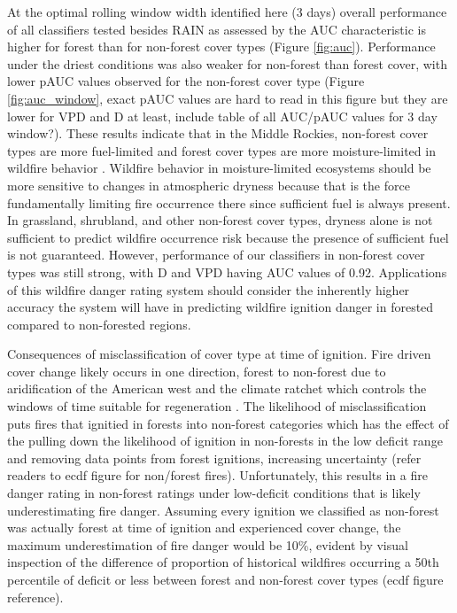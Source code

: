 \documentclass[11p]{article}
\begin{document}
At the optimal rolling window width identified here (3 days) overall performance of all classifiers tested besides RAIN as assessed by the AUC characteristic is higher for forest than for non-forest cover types (Figure \ref{fig:auc}). Performance under the driest conditions was also weaker for non-forest than forest cover, with lower pAUC values observed for the non-forest cover type (Figure \ref{fig:auc_window}, exact pAUC values are hard to read in this figure but they are lower for VPD and D at least, include table of all AUC/pAUC values for 3 day window?).  These results indicate that in the Middle Rockies, non-forest cover types are more fuel-limited and forest cover types are more moisture-limited in wildfire behavior \citep{meynEnvironmentalDriversLarge2007}. Wildfire behavior in moisture-limited ecosystems should be more sensitive to changes in atmospheric dryness because that is the force fundamentally limiting fire occurrence there since sufficient fuel is always present.  In grassland, shrubland, and other non-forest cover types, dryness alone is not sufficient to predict wildfire occurrence risk because the presence of sufficient fuel is not guaranteed.  However, performance of our classifiers in non-forest cover types was still strong, with D and VPD having AUC values of 0.92. Applications of this wildfire danger rating system should consider the inherently higher accuracy the system will have in predicting wildfire ignition danger in forested compared to non-forested regions.  

Consequences of misclassification of cover type at time of ignition. Fire driven cover change likely occurs in one direction, forest to non-forest due to aridification of the American west and the climate ratchet which controls the windows of time suitable for regeneration \citep{jacksonEcologyRatchetEvents2009}. The likelihood of misclassification puts fires that ignitied in forests into non-forest categories which has the effect of the pulling down the likelihood of ignition in non-forests in the low deficit range and removing data points from forest ignitions, increasing uncertainty (refer readers to ecdf figure for non/forest fires). Unfortunately, this results in a fire danger rating in non-forest ratings under low-deficit conditions that is likely underestimating fire danger. Assuming every ignition we classified as non-forest was actually forest at time of ignition and experienced cover change, the maximum underestimation of fire danger would be 10\%, evident by visual inspection of the difference of proportion of historical wildfires occurring a 50th percentile of deficit or less between forest and non-forest cover types (ecdf figure reference). 
\end{document}

